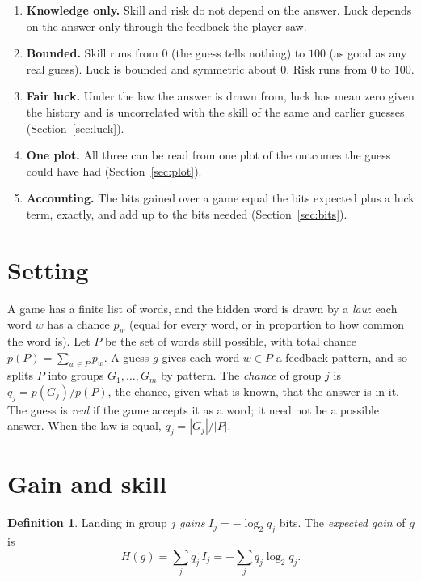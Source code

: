 \documentclass[11pt]{article}
\theoremstyle{definition}
\newtheorem{definition}{Definition}
\theoremstyle{remark}
\newcommand{\Gain}{I}
\begin{document}
\begin{enumerate}
\item[(R1)] \textbf{Knowledge only.} Skill and risk do not depend on the answer.
Luck depends on the answer only through the feedback the player saw.
\item[(R2)] \textbf{Bounded.} Skill runs from $0$ (the guess tells nothing) to $100$
(as good as any real guess). Luck is bounded and symmetric about $0$. Risk runs from
$0$ to $100$.
\item[(R3)] \textbf{Fair luck.} Under the law the answer is drawn from, luck has mean
zero given the history and is uncorrelated with the skill of the same and earlier
guesses (Section~\ref{sec:luck}).
\item[(R4)] \textbf{One plot.} All three can be read from one plot of the outcomes
the guess could have had (Section~\ref{sec:plot}).
\item[(R5)] \textbf{Accounting.} The bits gained over a game equal the bits expected
plus a luck term, exactly, and add up to the bits needed (Section~\ref{sec:bits}).
\end{enumerate}

\section{Setting}\label{sec:setting}

A game has a finite list of words, and the hidden word is drawn by a \emph{law}:
each word $w$ has a chance $p_w$ (equal for every word, or in proportion to how
common the word is). Let $P$ be the set of words still possible, with total chance
$p(P)=\sum_{w\in P}p_w$. A guess $g$ gives each word $w\in P$ a feedback pattern, and
so splits $P$ into groups $G_1,\dots,G_m$ by pattern. The \emph{chance} of group $j$
is $q_j=p(G_j)/p(P)$, the chance, given what is known, that the answer is in it. The
guess is \emph{real} if the game accepts it as a word; it need not be a possible
answer. When the law is equal, $q_j=|G_j|/|P|$.

\section{Gain and skill}\label{sec:skill}

\begin{definition}
Landing in group $j$ \emph{gains} $\Gain_j=-\log_2 q_j$ bits. The \emph{expected
gain} of $g$ is
\[
H(g)=\sum_j q_j\,\Gain_j=-\sum_j q_j\log_2 q_j .
\]
\end{definition}
\end{document}

